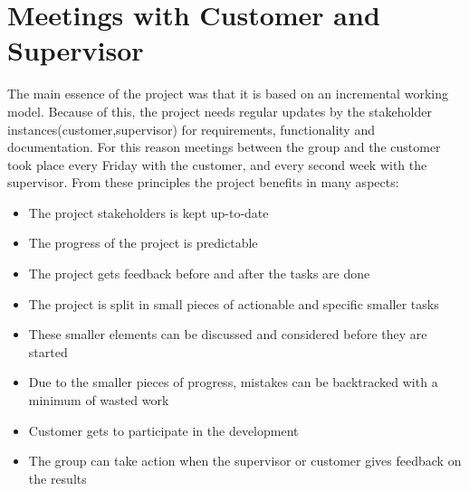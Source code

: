 \section{Meetings with Customer and Supervisor}
The main essence of the project was that it is based on an incremental working model. Because of this, the project needs regular updates by the stakeholder instances(customer,supervisor) for requirements, functionality and documentation. For this reason meetings between the group and the customer took place every Friday with the customer, and every second week with the supervisor.   
From these principles the project benefits in many aspects:
\begin{itemize}
\item The project stakeholders is kept up-to-date
\item The progress of the project is predictable
\item The project gets feedback before and after the tasks are done
\item The project is split in small pieces of actionable and specific smaller tasks
\item These smaller elements can be discussed and considered before they are started
\item Due to the smaller pieces of progress, mistakes can be backtracked with a minimum of wasted work
\item Customer gets to participate in the development
\item The group can take action when the supervisor or customer gives feedback on the results
\end{itemize}

